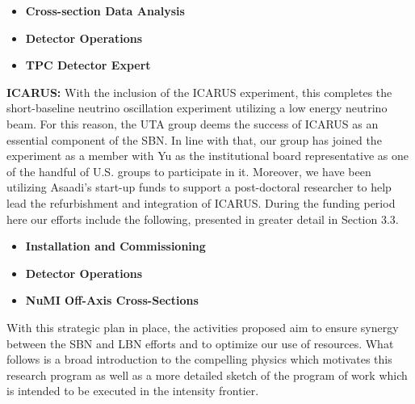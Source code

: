 \begin{itemize}
\item{\textbf{Cross-section Data Analysis}}
\item{\textbf{Detector Operations}}
\item{\textbf{TPC Detector Expert}}

\end{itemize}

\textbf{ICARUS:} With the inclusion of the ICARUS experiment, this completes the short-baseline neutrino oscillation experiment utilizing a low energy neutrino beam. For this reason, the UTA group deems the success of ICARUS as an essential component of the SBN. In line with that, our group has joined the experiment as a member with Yu as the institutional board representative as one of the handful of U.S. groups to participate in it. Moreover, we have been utilizing Asaadi's start-up funds to support a post-doctoral researcher to help lead the refurbishment and integration of ICARUS. During the funding period here our efforts include the following, presented in greater detail in Section 3.3.

\begin{itemize}
\item{\textbf{Installation and Commissioning}}
\item{\textbf{Detector Operations}}
\item{\textbf{NuMI Off-Axis Cross-Sections}}

\end{itemize}

With this strategic plan in place, the activities proposed aim to ensure synergy between the SBN and LBN efforts and to optimize our use of resources. What follows is a broad introduction to the compelling physics which motivates this research program as well as a more detailed sketch of the program of work which is intended to be executed in the intensity frontier.

